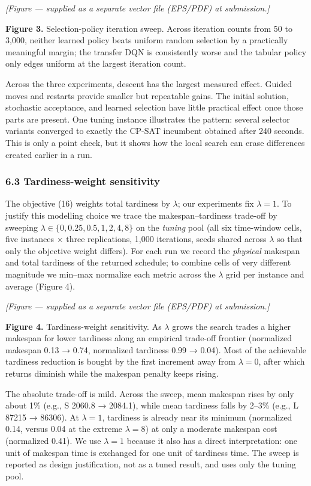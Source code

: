 \documentclass[
]{article}
\begin{document}
\emph{{[}Figure --- supplied as a separate vector file (EPS/PDF) at
submission.{]}}

\textbf{Figure 3.} Selection-policy iteration sweep. Across iteration counts from 50 to 3,000, neither learned policy beats uniform random
selection by a practically meaningful margin; the transfer DQN is
consistently worse and the tabular policy only edges uniform at the largest iteration count.

Across the three experiments, descent has the largest measured effect.
Guided moves and restarts provide smaller but repeatable gains. The
initial solution, stochastic acceptance, and learned selection have
little practical effect once those parts are present. One tuning
instance illustrates the pattern: several selector variants converged to
exactly the CP-SAT incumbent obtained after 240 seconds. This is only a
point check, but it shows how the local search can erase differences
created earlier in a run.

\subsubsection{6.3 Tardiness-weight
sensitivity}\label{tardiness-weight-sensitivity}

The objective (16) weights total tardiness by \(\lambda\); our
experiments fix \(\lambda=1\). To justify this modelling choice we trace
the makespan--tardiness trade-off by sweeping
\(\lambda\in\{0,0.25,0.5,1,2,4,8\}\) on the \emph{tuning} pool (all six
time-window cells, five instances × three replications, 1,000
iterations, seeds shared across \(\lambda\) so that only the objective
weight differs). For each run we record the \emph{physical} makespan and
total tardiness of the returned schedule; to combine cells of very
different magnitude we min--max normalize each metric across the
\(\lambda\) grid per instance and average (Figure 4).

\emph{{[}Figure --- supplied as a separate vector file (EPS/PDF) at
submission.{]}}

\textbf{Figure 4.} Tardiness-weight sensitivity. As \(\lambda\) grows
the search trades a higher makespan for lower tardiness along an
empirical trade-off frontier (normalized makespan 0.13 → 0.74,
normalized tardiness 0.99 → 0.04). Most of the achievable tardiness
reduction is bought by the first increment away from \(\lambda=0\),
after which returns diminish while the makespan penalty keeps rising.

The absolute trade-off is mild. Across the sweep, mean makespan rises by
only about 1\% (e.g., S 2060.8 → 2084.1), while mean tardiness falls by
2--3\% (e.g., L 87215 → 86306). At \(\lambda=1\), tardiness is already
near its minimum (normalized 0.14, versus 0.04 at the extreme
\(\lambda=8\)) at only a moderate makespan cost (normalized 0.41). We
use \(\lambda=1\) because it also has a direct interpretation: one unit
of makespan time is exchanged for one unit of tardiness time. The sweep
is reported as design justification, not as a tuned result, and uses
only the tuning pool.
\end{document}
